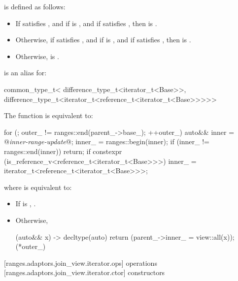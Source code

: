 \pnum
{} is defined as follows:
\begin{itemize}
\item If  satisfies , and if
 is , and if
 satisfies , then
 is .
\item Otherwise, if  satisfies , and if
 is , and if
 satisfies , then
 is .
\item Otherwise,  is .
\end{itemize}

\pnum
{} is an alias for:
\begin{codeblock}
common_type_t<
difference_type_t<iterator_t<Base>>,
difference_type_t<iterator_t<reference_t<iterator_t<Base>>>>>
\end{codeblock}

\pnum
The  function is equivalent to:
\begin{codeblock}
for (; outer_ != ranges::end(parent_->base_); ++outer_) {
  auto&& inner = @\textit{inner-range-update}@;
  inner_ = ranges::begin(inner);
  if (inner_ != ranges::end(inner))
    return;
}
if constexpr (is_reference_v<reference_t<iterator_t<Base>>>)
  inner_ = iterator_t<reference_t<iterator_t<Base>>>{};
\end{codeblock}

where  is equivalent to:
\begin{itemize}
\item If  is ,
.
\item Otherwise,
\begin{codeblock}
[this](auto&& x) -> decltype(auto) {
return (parent_->inner_ = view::all(x));
}(*outer_)
\end{codeblock}
\end{itemize}

[ranges.adaptors.join_view.iterator.ops]{ operations}
[ranges.adaptors.join_view.iterator.ctor]{ constructors}

